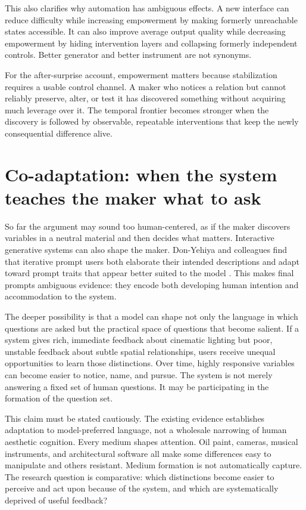 \documentclass[11pt]{article}
\begin{document}
This also clarifies why automation has ambiguous effects. A new interface can reduce difficulty while increasing empowerment by making formerly unreachable states accessible. It can also improve average output quality while decreasing empowerment by hiding intervention layers and collapsing formerly independent controls. Better generator and better instrument are not synonyms.

For the after-surprise account, empowerment matters because stabilization requires a usable control channel. A maker who notices a relation but cannot reliably preserve, alter, or test it has discovered something without acquiring much leverage over it. The temporal frontier becomes stronger when the discovery is followed by observable, repeatable interventions that keep the newly consequential difference alive.

\section{Co-adaptation: when the system teaches the maker what to ask}

So far the argument may sound too human-centered, as if the maker discovers variables in a neutral material and then decides what matters. Interactive generative systems can also shape the maker. Don-Yehiya and colleagues find that iterative prompt users both elaborate their intended descriptions and adapt toward prompt traits that appear better suited to the model \citep{DonYehiyaEtAl2023}. This makes final prompts ambiguous evidence: they encode both developing human intention and accommodation to the system.

The deeper possibility is that a model can shape not only the language in which questions are asked but the practical space of questions that become salient. If a system gives rich, immediate feedback about cinematic lighting but poor, unstable feedback about subtle spatial relationships, users receive unequal opportunities to learn those distinctions. Over time, highly responsive variables can become easier to notice, name, and pursue. The system is not merely answering a fixed set of human questions. It may be participating in the formation of the question set.

This claim must be stated cautiously. The existing evidence establishes adaptation to model-preferred language, not a wholesale narrowing of human aesthetic cognition. Every medium shapes attention. Oil paint, cameras, musical instruments, and architectural software all make some differences easy to manipulate and others resistant. Medium formation is not automatically capture. The research question is comparative: which distinctions become easier to perceive and act upon because of the system, and which are systematically deprived of useful feedback?
\end{document}
